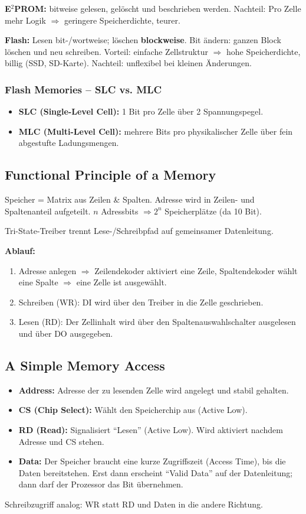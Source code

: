 \documentclass[11pt,a4paper]{article}
\begin{document}
\textbf{E$^2$PROM:} bitweise gelesen, gelöscht und beschrieben werden. Nachteil: Pro Zelle mehr Logik $\Rightarrow$ geringere Speicherdichte, teurer.

\textbf{Flash:} Lesen bit-/wortweise; löschen \textbf{blockweise}. Bit ändern: ganzen Block löschen und neu schreiben. Vorteil: einfache Zellstruktur $\Rightarrow$ hohe Speicherdichte, billig (SSD, SD-Karte). Nachteil: unflexibel bei kleinen Änderungen.

\subsubsection{Flash Memories -- SLC vs. MLC}
\begin{itemize}
    \item \textbf{SLC (Single-Level Cell):} 1 Bit pro Zelle über 2 Spannungspegel.
    \item \textbf{MLC (Multi-Level Cell):} mehrere Bits pro physikalischer Zelle über fein abgestufte Ladungsmengen.
\end{itemize}

\subsection{Functional Principle of a Memory}
Speicher = Matrix aus Zeilen \& Spalten. Adresse wird in Zeilen- und Spaltenanteil aufgeteilt. $n$ Adressbits $\Rightarrow 2^n$ Speicherplätze (da 10 Bit).

Tri-State-Treiber trennt Lese-/Schreibpfad auf gemeinsamer Datenleitung.

\textbf{Ablauf:}
\begin{enumerate}
    \item Adresse anlegen $\Rightarrow$ Zeilendekoder aktiviert eine Zeile, Spaltendekoder wählt eine Spalte $\Rightarrow$ eine Zelle ist ausgewählt.
    \item Schreiben (WR): DI wird über den Treiber in die Zelle geschrieben.
    \item Lesen (RD): Der Zellinhalt wird über den Spaltenauswahlschalter ausgelesen und über DO ausgegeben.
\end{enumerate}

\subsection{A Simple Memory Access}
\begin{itemize}
    \item \textbf{Address:} Adresse der zu lesenden Zelle wird angelegt und stabil gehalten.
    \item \textbf{CS (Chip Select):} Wählt den Speicherchip aus (Active Low).
    \item \textbf{RD (Read):} Signalisiert ``Lesen'' (Active Low). Wird aktiviert nachdem Adresse und CS stehen.
    \item \textbf{Data:} Der Speicher braucht eine kurze Zugriffszeit (Access Time), bis die Daten bereitstehen. Erst dann erscheint ``Valid Data'' auf der Datenleitung; dann darf der Prozessor das Bit übernehmen.
\end{itemize}
Schreibzugriff analog: WR statt RD und Daten in die andere Richtung.
\end{document}
